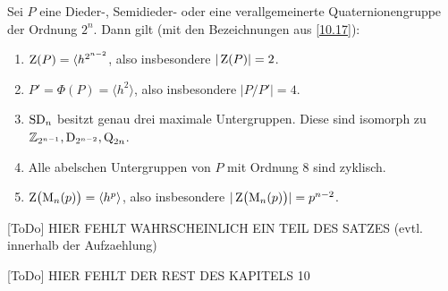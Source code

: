 \begin{satz}\label{10.18}
 Sei $P$ eine Dieder-, Semidieder- oder eine verallgemeinerte Quaternionengruppe der Ordnung $2^n$. Dann gilt (mit den Bezeichnungen aus \ref{10.17}):
\begin{enumerate}
 \item $\operatorname{Z}(P)=\langle h^{2^{n-2}}$, also insbesondere $|\operatorname{Z}(P)|=2$.
 \item $P'=\Phi(P)=\langle h^2\rangle$, also insbesondere $|P/P'|=4$.
 \item $\operatorname{SD}_n$ besitzt genau drei maximale Untergruppen. Diese sind isomorph zu $\mathbb{Z}_{2^{n-1}}, \operatorname{D}_{2^{n-2}},\operatorname{Q}_{2n}$.
 \item Alle abelschen Untergruppen von $P$ mit Ordnung $8$ sind zyklisch.
 \item $\operatorname{Z}\bigl(\operatorname{M}_n(p)\bigr)=\langle h^p\rangle$, also insbesondere $|\operatorname{Z}\bigl(\operatorname{M}_n(p)\bigr)|=p^{n-2}$.
 
\end{enumerate}
 [ToDo] HIER FEHLT WAHRSCHEINLICH EIN TEIL DES SATZES (evtl. innerhalb der Aufzaehlung)
\end{satz}

[ToDo] HIER FEHLT DER REST DES KAPITELS 10



